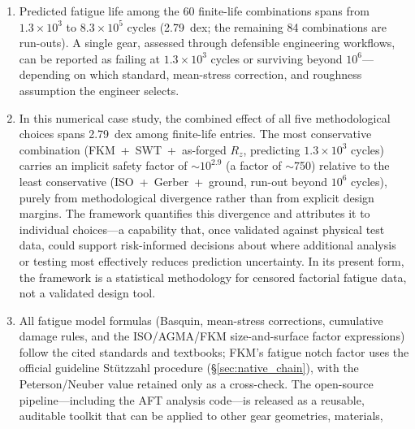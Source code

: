 \documentclass[twocolumn,12pt,a4paper]{article}
\begin{document}
\begin{enumerate}
        near-zero result is therefore not a finding about the
        unimportance of S--N curves in general, but about the
        specific contrast between the two datasets selected.
        The cumulative damage rule contributes 0.3\% under
        constant-amplitude loading; this figure must not be extrapolated
        to variable-amplitude spectra, where sequence effects and
        damage-rule differences could produce substantially larger
        divergence.
  \item Predicted fatigue life among the 60 finite-life combinations spans from
        $1.3\times10^3$ to $8.3\times10^5$ cycles (2.79~dex; the remaining
        84 combinations are run-outs). A single gear, assessed
        through defensible engineering workflows, can be reported as
        failing at $1.3\times10^3$ cycles or surviving beyond $10^6$---depending on
        which standard, mean-stress correction, and roughness
        assumption the engineer selects.
  \item In this numerical case study, the combined effect of all five
        methodological choices spans 2.79~dex among finite-life entries. The most conservative
        combination (FKM~+~SWT~+~as-forged $R_z$, predicting
        $1.3\times10^{3}$ cycles) carries an implicit safety factor of
        $\sim$$10^{2.9}$ (a factor of $\sim$750) relative to the
        least conservative (ISO~+~Gerber~+~ground, run-out beyond
        $10^6$ cycles), purely from
        methodological divergence rather than from explicit design
        margins. The framework quantifies this divergence and attributes
        it to individual choices---a capability that, once validated
        against physical test data, could support risk-informed
        decisions about where additional analysis or testing most
        effectively reduces prediction uncertainty. In its present
        form, the framework is a statistical methodology for censored
        factorial fatigue data, not a validated design tool.
  \item All fatigue model formulas (Basquin, mean-stress corrections,
        cumulative damage rules, and the ISO/AGMA/FKM size-and-surface
        factor expressions) follow the cited standards and textbooks;
        FKM's fatigue notch factor uses the official guideline
        St\"utzzahl procedure (\S\ref{sec:native_chain}), with the
        Peterson/Neuber value retained only as a cross-check. The open-source pipeline---including
        the AFT analysis code---is released as a reusable, auditable
        toolkit that can be applied to other gear geometries, materials,
$$
\end{enumerate}
\end{document}

